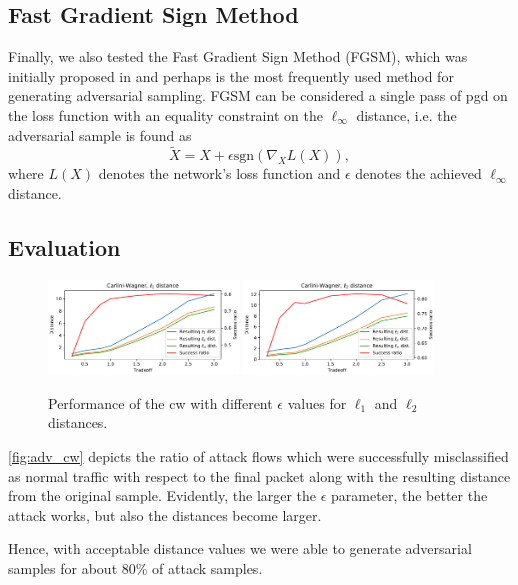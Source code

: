 \documentclass[conference]{IEEEtran}
\begin{document}
\subsection{Fast Gradient Sign Method}
Finally, we also tested the Fast Gradient Sign Method (FGSM), which was initially proposed in \cite{goodfellow_explaining_2015} and perhaps is the most frequently used method for generating adversarial sampling. FGSM can be considered a single pass of \gls{pgd} on the loss function with an equality constraint on the $\ell_\infty$ distance, i.e. the adversarial sample is found as
\begin{equation}
\tilde X = X + \epsilon \text{sgn}( \nabla_X L(X)),
\end{equation}
where $L(X)$ denotes the network's loss function and $\epsilon$ denotes the achieved $\ell_\infty$ distance.

\subsection{Evaluation}
\begin{figure}
\includegraphics[width=0.45\textwidth]{adv_plots/cwl1.pdf}
\includegraphics[width=0.45\textwidth]{adv_plots/cwl2.pdf}
\caption{Performance of the \gls{cw} with different $\epsilon$ values for $\ell_1$ and $\ell_2$ distances.}
\label{fig:adv_cw}
\end{figure}
\autoref{fig:adv_cw} depicts the ratio of attack flows which were successfully misclassified as normal traffic with respect to the final packet along with the resulting distance from the original sample. Evidently, the larger the $\epsilon$ parameter, the better the attack works, but also the distances become larger.

Hence, with acceptable distance values we were able to generate adversarial samples for about 80\% of attack samples.
\end{document}
